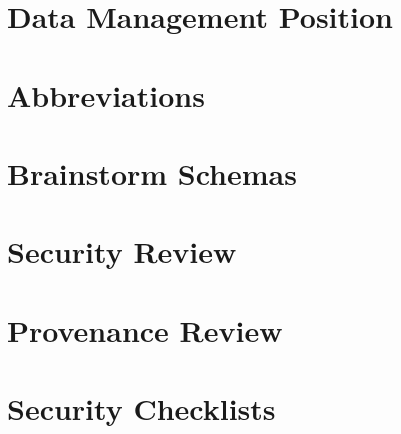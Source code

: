 \documentclass[a4paper]{report}
\begin{document}
	
	
	
	
	
	
	\chapter{Data Management Position}
	\label{position}
	
	
	
	
	
	
	
	
	
	\clearpage
	
	\printbibliography
	
	\appendix
	\chapter{Abbreviations}
	\label{abbreviations}
	
	
	
	\chapter{Brainstorm Schemas}
	\label{brainstorm-before-after}
	
	
	
	\chapter{Security Review}
	\label{security-review-appendix}
	
	
	
	
	
	\chapter{Provenance Review}
	\label{provenance-review-appendix}
	
	
	
	\chapter{Security Checklists}
	\label{security-appendix}
	
\end{document}
